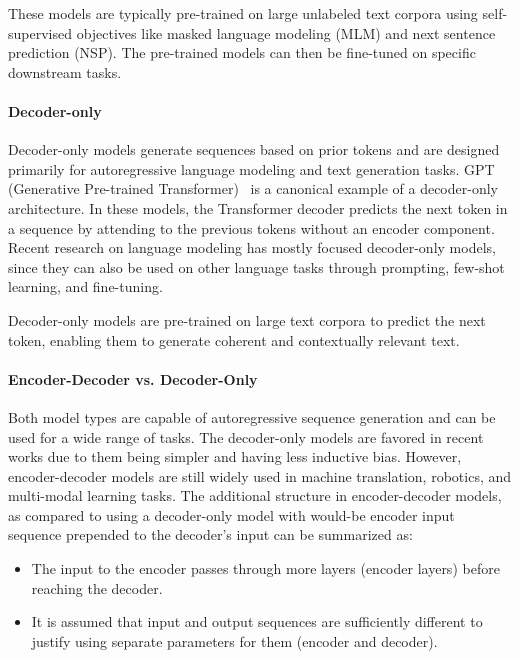 These models are typically pre-trained on large unlabeled text corpora using self-supervised objectives like masked language modeling (MLM) and next sentence prediction (NSP). The pre-trained models can then be fine-tuned on specific downstream tasks.

\paragraph{Decoder-only}

Decoder-only models generate sequences based on prior tokens and are designed primarily for autoregressive language modeling and text generation tasks. GPT (Generative Pre-trained Transformer)~\cite{radford_improving_2018} is a canonical example of a decoder-only architecture. In these models, the Transformer decoder predicts the next token in a sequence by attending to the previous tokens without an encoder component. Recent research on language modeling has mostly focused decoder-only models, since they can also be used on other language tasks through prompting, few-shot learning, and fine-tuning.

Decoder-only models are pre-trained on large text corpora to predict the next token, enabling them to generate coherent and contextually relevant text.

\bigskip

\paragraph{Encoder-Decoder vs. Decoder-Only} Both model types are capable of autoregressive sequence generation and can be used for a wide range of tasks. The decoder-only models are favored in recent works due to them being simpler and having less inductive bias. However, encoder-decoder models are still widely used in machine translation, robotics, and multi-modal learning tasks. The additional structure in encoder-decoder models, as compared to using a decoder-only model with would-be encoder input sequence prepended to the decoder's input can be summarized as:
\begin{itemize}
    \item The input to the encoder passes through more layers (encoder layers) before reaching the decoder.
    \item It is assumed that input and output sequences are sufficiently different to justify using separate parameters for them (encoder and decoder).
\end{itemize}

